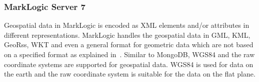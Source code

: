 \documentclass[a4paper,12pt]{article}
\begin{document}

\subsubsection{MarkLogic Server 7}
Geospatial data in MarkLogic is encoded as XML elements and/or attributes in different representations. MarkLogic handles the geospatial data in GML, KML, GeoRss, WKT and even a general format for geometric data which are not based on a specified format as explained in~\cite{marklogicGeo}. Similar to MongoDB, WGS84 and the raw coordinate systems are supported for geospatial data. WGS84 is used for data on the earth and the raw coordinate system is suitable for the data on the flat plane.
\end{document}
